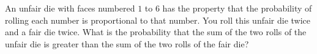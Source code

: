 An unfair die with faces numbered $1$ to $6$ has the property that the probability of rolling each number is proportional to that number. You roll this unfair die twice and a fair die twice. What is the probability that the sum of the two rolls of the unfair die is greater than the sum of the two rolls of the fair die?
